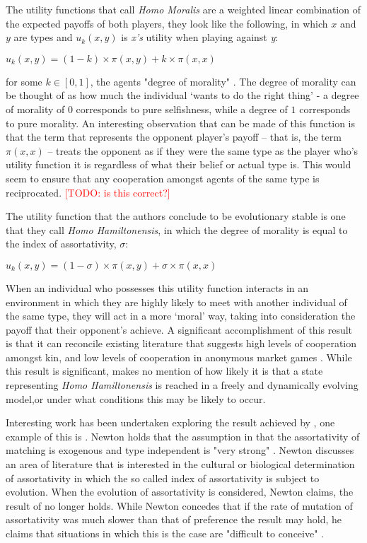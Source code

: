 \documentclass[11pt]{article}
\newcommand{\todo}[1]{\textcolor{red}{[TODO: #1]}\PackageWarning{TODO:}{#1!}}
\newcommand*{\np}{\par\noindent\newline}
\begin{document}
\np The utility functions that \citet{alger_homo_2013} call \textit{Homo Moralis} are a weighted linear combination of
the expected payoffs of both players, they look like the following, in which $x$ and $y$ are types and $u_k(x, y)$ is
\textit{x's} utility when playing against \textit{y}:
\begin{center}
	$u_k(x, y) = (1 - k) \times \pi(x, y) + k \times \pi(x, x)$
\end{center}
for some $k \in [0, 1]$, the agents "degree of morality" \citep[~p 2274.]{alger_homo_2013}. The degree of morality can
be thought of as how much the individual `wants to do the right thing' - a degree of morality of $0$ corresponds to pure
selfishness, while a degree of $1$ corresponds to pure morality. An interesting observation that can be made of this
function is that the term that represents the opponent player's payoff -- that is, the term $\pi(x,x)$ -- treats the
opponent as if they were the same type as the player who's utility function it is regardless of what their belief or
actual type is. This would seem to ensure that any cooperation amongst agents of the same type is reciprocated. \todo{is this correct?}

\np The  utility function that the authors conclude to be evolutionary stable is one that they call \textit{Homo
Hamiltonensis}, in which the degree of morality is equal to the index of assortativity, $\sigma$:
\begin{center}
	$u_k(x, y) = (1 - \sigma) \times \pi(x, y) + \sigma \times \pi(x, x)$
\end{center}
When an individual who possesses this utility function interacts in an environment in which they are highly likely
to meet with another individual of the same type, they will act in a more `moral' way, taking into consideration the
payoff that their opponent's achieve. A significant accomplishment of this result is that it can reconcile existing
literature that suggests high levels of cooperation amongst kin, and low levels of cooperation in anonymous market games \citep[See ][~p. 2296]{alger_homo_2013}. While this result is significant, \citep{alger_homo_2013} makes no
mention of how likely it is that a state representing \textit{Homo Hamiltonensis} is reached in a freely and dynamically
evolving model,or under what conditions this may be likely to occur.

\np Interesting work has been undertaken exploring the result achieved by \citet{alger_homo_2013}, one example of this
is \citet{newton_preferences_2017}. Newton holds that the assumption in \citet{alger_homo_2013} that the assortativity
of matching is exogenous and type independent is "very strong" \citep{newton_preferences_2017}. Newton discusses an area
of literature that is interested in the cultural or biological determination of assortativity in which the
so called index of assortativity is subject to evolution. When the evolution of assortativity is considered, Newton
claims, the result of \citet{alger_homo_2013} no longer holds. While Newton concedes that if the rate of mutation of
assortativity was much slower than that of preference the result may hold, he claims that situations in which this is
the case are "difficult to conceive" \citep{newton_preferences_2017}.
\end{document}
